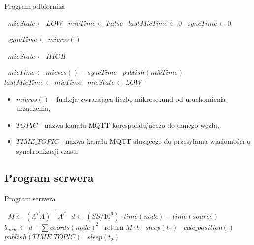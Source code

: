 \begin{algorithm}
\caption{Program odbiornika}\label{alg:sink}
\begin{algorithmic}[1]
    \State\ $micState \gets LOW$
    \State\ $micTime \gets False$
    \State\ $lastMicTime \gets 0$
    \State\ $syncTime \gets 0$

            \State\ $syncTime \gets micros()$
        \EndIf
    \EndFunction

        \State\ $micState \gets HIGH$
    \EndFunction

    \Loop
            \State\ $micTime \gets micros() - syncTime$
            \State\ $publish(micTime)$
            \State\ $lastMicTime \gets micTime$
            \State\ $micState \gets LOW$
        \EndIf
    \EndLoop
\end{algorithmic}
\end{algorithm}

\begin{itemize}
    \item $micros()$ {-} funkcja zwracająca liczbę mikrosekund od uruchomienia urządzenia,
    \item $TOPIC$ {-} nazwa kanału MQTT korespondującego do danego węzła,
    \item $TIME\_TOPIC$ {-} nazwa kanału MQTT służącego do przesyłania wiadomości o synchronizacji czasu.
\end{itemize}

\subsection{Program serwera}

\begin{algorithm}
\caption{Program serwera}\label{alg:server}
\begin{algorithmic}[1]
    \State\ $M \gets {\left(A^T A\right)}^{-1} A^T$
            \State\ $d \gets (SS / 10^{6}) \cdot time(node) - time(source)$
            \State\ $b_{node} \gets d - \sum{coords(node)^2}$
        \EndFor
        \State\ return $M \cdot b$
    \EndFunction
        \State\ $sleep(t_1)$
        \State\ $calc\_position()$
    \EndLoop
        \State\ $publish(TIME\_TOPIC)$
        \State\ $sleep(t_2)$
    \EndLoop
\end{algorithmic}
\end{algorithm}

